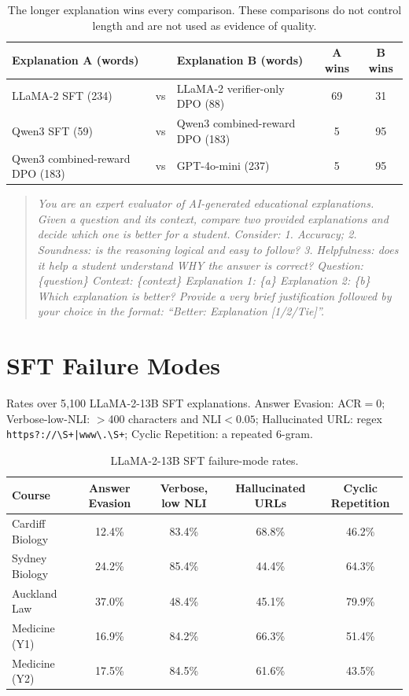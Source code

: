 \begin{table}[h]
\centering
\small
\begin{tabular}{l|c|l|c|c}
\toprule
Explanation A (words) & & Explanation B (words) & A wins & B wins \\
\midrule
LLaMA-2 SFT (234) & vs & LLaMA-2 verifier-only DPO (88) & 69 & 31 \\
Qwen3 SFT (59) & vs & Qwen3 combined-reward DPO (183) & 5 & 95 \\
Qwen3 combined-reward DPO (183) & vs & GPT-4o-mini (237) & 5 & 95 \\
\bottomrule
\end{tabular}
\caption{The longer explanation wins every comparison. These comparisons do not control length and are not used as evidence of quality.}
\label{tab:pairwise_1}
\end{table}

\begin{quote}\small\itshape
You are an expert evaluator of AI-generated educational explanations. Given a question and its context, compare two provided explanations and decide which one is better for a student. Consider: 1. Accuracy; 2. Soundness: is the reasoning logical and easy to follow? 3. Helpfulness: does it help a student understand WHY the answer is correct? Question: \{question\} Context: \{context\} Explanation 1: \{a\} Explanation 2: \{b\} Which explanation is better? Provide a very brief justification followed by your choice in the format: ``Better: Explanation [1/2/Tie]''.
\end{quote}

\section{SFT Failure Modes}
\label{sec:failure_mode_appendix}
Rates over 5{,}100 LLaMA-2-13B SFT explanations. Answer Evasion: ACR${=}0$; Verbose-low-NLI: $>$400 characters and NLI${<}0.05$; Hallucinated URL: regex \texttt{https?://\textbackslash S+|www\textbackslash .\textbackslash S+}; Cyclic Repetition: a repeated 6-gram.

\begin{table}[h]
\centering
\small
\begin{tabular}{l|c|c|c|c}
\toprule
Course & Answer Evasion & Verbose, low NLI & Hallucinated URLs & Cyclic Repetition \\
\midrule
Cardiff Biology & 12.4\% & 83.4\% & 68.8\% & 46.2\% \\
Sydney Biology  & 24.2\% & 85.4\% & 44.4\% & 64.3\% \\
Auckland Law    & 37.0\% & 48.4\% & 45.1\% & 79.9\% \\
Medicine (Y1)   & 16.9\% & 84.2\% & 66.3\% & 51.4\% \\
Medicine (Y2)   & 17.5\% & 84.5\% & 61.6\% & 43.5\% \\
\bottomrule
\end{tabular}
\caption{LLaMA-2-13B SFT failure-mode rates.}
\label{tab:failure_modes}
\end{table}

